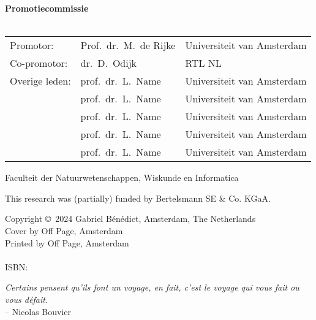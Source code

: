 {%
\clearpage
\noindent%
\textbf{Promotiecommissie} \\\\
\begin{tabular}{@{}l l l}
Promotor: 
& Prof.\ dr.\ M.\ de Rijke & Universiteit van Amsterdam \\[0.5ex]  %
Co-promotor: & dr.\ D.\ Odijk & RTL NL \\[0.5ex]  %
Overige leden: 
& prof.\ dr.\ L.\ Name & Universiteit van Amsterdam \\
& prof.\ dr.\ L.\ Name & Universiteit van Amsterdam \\
& prof.\ dr.\ L.\ Name & Universiteit van Amsterdam \\
& prof.\ dr.\ L.\ Name & Universiteit van Amsterdam \\
& prof.\ dr.\ L.\ Name & Universiteit van Amsterdam 
\end{tabular}

\bigskip\noindent%
Faculteit der Natuurwetenschappen, Wiskunde en Informatica\\

\vfill

\noindent
This research was (partially) funded by Bertelsmann SE \& Co. KGaA.
\bigskip

\noindent
Copyright \copyright~2024 Gabriel Bénédict, Amsterdam, The Netherlands\\		%
Cover by Off Page, Amsterdam\\
Printed by Off Page, Amsterdam\\
\\
ISBN: \todo{}\\


\clearpage






\thispagestyle{empty}
\null\vfill
\centering
\textit{Certains pensent qu'ils font un voyage, en fait, c'est le voyage qui vous fait ou vous défait.} \\ \medskip
\qquad \qquad \qquad \qquad \qquad -- {Nicolas Bouvier}
\vfill\vfill

\clearpage




}

